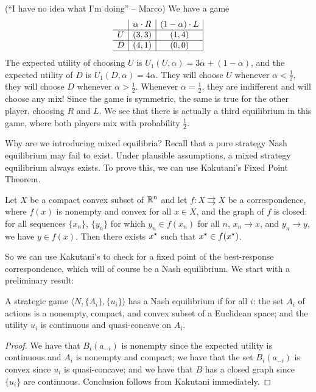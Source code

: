 \documentclass[10pt]{article}
\begin{document}
\begin{example}
	 (``I have no idea what I'm doing'' -- Marco) We have a game
	\[
	\begin{array}{c|c|c|}
		& \alpha \cdot R & (1-\alpha)\cdot L \\
		\hline 
		U & (3,3) & (1,4) \\\hline
		D & (4,1) & (0,0) \\\hline
	\end{array}
	\]
	The expected utility of choosing $U$ is $U_1(U,\alpha) = 3\alpha + (1-\alpha)$, and the expected utility of $D$ is $U_1(D,\alpha) = 4\alpha$. They will choose $U$ whenever $\alpha < \frac{1}{2}$, they will choose $D$ whenever $\alpha > \frac{1}{2}$. Whenever $\alpha = \frac{1}{2}$, they are indifferent and will choose any mix! Since the game is symmetric, the same is true for the other player, choosing $R$ and $L$. We see that there is actually a third equilibrium in this game, where both players mix with probability $\frac{1}{2}$.
\end{example}

\begin{question}
	Why are we introducing mixed equilibria? Recall that a pure strategy Nash equilibrium may fail to exist. Under plausible assumptions, a mixed strategy equilibrium always exists. To prove this, we can use Kakutani's Fixed Point Theorem. 
\end{question}

\begin{theorem}
	 Let $X$ be a compact convex subset of $\mathbb{R}^n$ and let $f: X \rightrightarrows X$ be a correspondence, where $f(x)$ is nonempty and convex for all $x \in X$, and the graph of $f$ is closed: for all sequences $\{x_n\}$, $\{y_n\}$ for which $y_n \in f(x_n)$ for all $n$, $x_n \to x$, and $y_n \to y$, we have $y \in f(x)$. Then there exists $x^\star $ such that $x^\star \in f(x^\star)$.
\end{theorem}

So we can use Kakutani's to check for a fixed point of the best-response correspondence, which will of course be a Nash equilibrium. We start with a preliminary result:

\begin{theorem}
	A strategic game $\langle N , \{A_i\},\{u_i\}\rangle$ has a Nash equilibrium if for all $i$: the set $A_i$ of actions is a nonempty, compact, and convex subset of a Euclidean space; and the utility $u_i$ is continuous and quasi-concave on $A_i$.
\end{theorem}
\begin{proof}
	We have that $B_i(a_{-i})$ is nonempty since the expected utility is continuous and $A_i$ is nonempty and compact; we have that the set $B_i(a_{-i})$ is convex since $u_i$ is quasi-concave; and we have that $B$ has a closed graph since $\{u_i\}$ are continuous. Conclusion follows from Kakutani immediately.
\end{proof}
\end{document}
